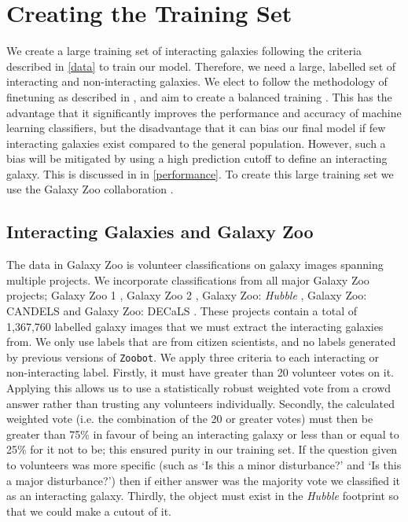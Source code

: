 \section{Creating the Training Set}\label{training}
\noindent We create a large training set of interacting galaxies following the criteria described in \DIFdelbegin {}\DIFdelend \DIFaddbegin {}\DIFaddend \ref{data} to train our model. Therefore, we need a large, labelled set of interacting and non-interacting galaxies. We elect to follow the methodology of finetuning as described in \citet{2022MNRAS.513.1581W}, and aim to create a balanced training \DIFdelbegin {}\DIFdelend \DIFaddbegin {}\DIFaddend . This has the advantage that it significantly improves the performance and accuracy of machine learning classifiers, but the disadvantage that it can bias our final model if few interacting galaxies exist compared to the general population. However, such a bias will be mitigated by using a high prediction cutoff to define an interacting galaxy. This is discussed in in \DIFdelbegin {}\DIFdelend \DIFaddbegin {}\DIFaddend \ref{performance}. To create this large training set we use the Galaxy Zoo collaboration \citep[initial data release described in][]{2008MNRAS.389.1179L}.

\subsection{Interacting Galaxies and Galaxy Zoo}
\noindent The data in Galaxy Zoo is volunteer classifications on galaxy images spanning multiple projects. We incorporate classifications from all major Galaxy Zoo projects; Galaxy Zoo 1 \citep{2008MNRAS.389.1179L}, Galaxy Zoo 2 \citep{2013MNRAS.435.2835W}, Galaxy Zoo: \emph{Hubble} \citep{2017MNRAS.464.4176W}, Galaxy Zoo: CANDELS \citep{2017MNRAS.464.4420S} and Galaxy Zoo: DECaLS \citep{2022MNRAS.509.3966W}. These projects contain a total of 1,367,760 labelled galaxy images that we must extract the interacting galaxies from. We only use labels that are from citizen scientists, and no labels generated by previous versions of \texttt{Zoobot}. We apply three criteria to each interacting or non-interacting label. Firstly, it must have greater than 20 volunteer votes on it. Applying this allows us to use a statistically robust weighted vote from a crowd answer rather than trusting any volunteers individually. Secondly, the calculated weighted vote (i.e. the combination of the 20 or greater votes) must then be greater than 75\% in favour of being an interacting galaxy or less than or equal to 25\% for it not to be; this ensured purity in our training set. If the question given to volunteers was more specific (such as `Is this a minor disturbance?' and `Is this a major disturbance?') then if either answer was the majority vote we classified it as an interacting galaxy. Thirdly, the object must exist in the \emph{Hubble} footprint so that we could make a cutout of it.

